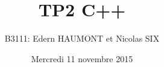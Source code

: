 \documentclass[a4paper, 12pts]{article}
\title{TP2 C++}
\author{B3111: Edern HAUMONT et Nicolas SIX}
\date{Mercredi 11 novembre 2015}
\begin{document}
\begin{titlepage}

\maketitle

\end{titlepage}


\tableofcontents

\pagebreak



\end{document}
